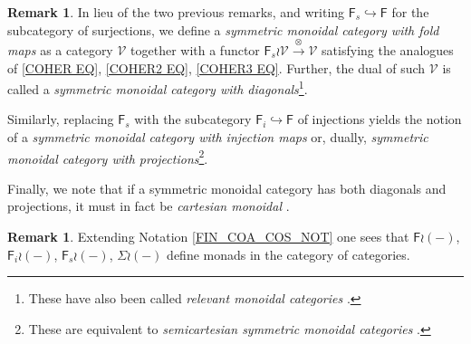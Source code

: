 \documentclass[a4paper,10pt
,draft
]{article}%
\numberwithin{equation}{section}
\numberwithin{figure}{section}
\theoremstyle{definition} %
\newtheorem{remark}[equation]{Remark}%
\newcommand{\Fin}{\mathsf{F}}%
\newcommand{\F}{\ensuremath{\mathcal F}}
\newcommand{\1}{\ensuremath{\mathbbm 1}}%
\begin{document}


\begin{remark}\label{FINSURJ REM}
	In lieu of the two previous remarks,
	and writing $\Fin_s \hookrightarrow \Fin$ 
	for the subcategory of surjections,
	we define a 
	\textit{symmetric monoidal category with fold maps}
	as a category $\mathcal{V}$ together with a functor
	$\Fin_s \wr \mathcal{V} \xrightarrow{\otimes} \mathcal{V}$
	satisfying the analogues of  
	\eqref{COHER EQ}, \eqref{COHER2 EQ}, \eqref{COHER3 EQ}.
	Further, the dual of such $\mathcal{V}$ is called a 
	\textit{symmetric monoidal category with diagonals}\footnote{
	These have also been called \textit{relevant monoidal categories} \cite{DP07}.}.
	
	Similarly, replacing $\Fin_s$ with the subcategory
$\Fin_i \hookrightarrow \Fin$ of injections yields the notion of a \textit{symmetric monoidal category with injection maps} or, dually, \textit{symmetric monoidal category with projections}\footnote{
These are equivalent to \textit{semicartesian symmetric monoidal categories} \cite{Lei16}.}.

Finally, we note that if a symmetric monoidal category has both diagonals and projections, it must in fact be \textit{cartesian monoidal} \cite[IV.2]{EK66}.
\end{remark}


\begin{remark}
	Extending Notation \ref{FIN_COA_COS_NOT} one sees that 
	$\Fin \wr (\minus)$, 
	$\Fin_i \wr (\minus)$,
	$\Fin_s \wr (\minus)$,
	$\Sigma \wr (\minus)$
define monads in the category of categories.
%	
\end{remark}
\end{document}
